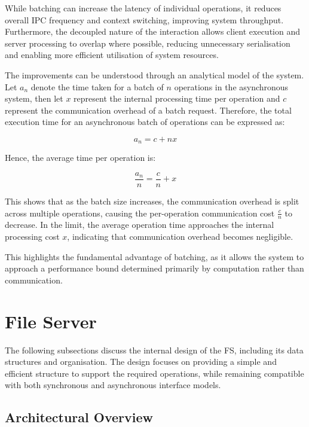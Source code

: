 While batching can increase the latency of individual operations, it reduces overall IPC frequency and context switching, improving system throughput. Furthermore, the decoupled nature of the interaction allows client execution and server processing to overlap where possible, reducing unnecessary serialisation and enabling more efficient utilisation of system resources.

The improvements can be understood through an analytical model of the system. Let $a_n$ denote the time taken for a batch of $n$ operations in the asynchronous system, then let $x$ represent the internal processing time per operation and $c$ represent the communication overhead of a batch request.
\newpage
Therefore, the total execution time for an asynchronous batch of operations can be expressed as:

\begin{equation}
a_n = c + n x
\end{equation}

Hence, the average time per operation is:

\begin{equation}
\frac{a_n}{n} = \frac{c}{n} + x
\end{equation}

This shows that as the batch size increases, the communication overhead is split across multiple operations, causing the per-operation communication cost $\frac{c}{n}$ to decrease. In the limit, the average operation time approaches the internal processing cost $x$, indicating that communication overhead becomes negligible.

This highlights the fundamental advantage of batching, as it allows the system to approach a performance bound determined primarily by computation rather than communication.

\section{File Server}

The following subsections discuss the internal design of the FS, including its data structures and organisation. The design focuses on providing a simple and efficient structure to support the required operations, while remaining compatible with both synchronous and asynchronous interface models. 

\subsection{Architectural Overview}

